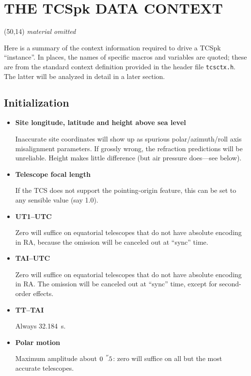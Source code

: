 \documentclass[12pt,fleqn,twoside]{article}
\renewcommand{\_}{{\tt\char'137}}     %
\newcommand{\arcsec}[2] {\arcseci{#1}$\hspace{-0.4em}.#2$}
\newcommand{\arcseci}[1] {$#1\hspace{0.05em}$\raisebox{-0.5ex}
                         {$^{'\hspace{-0.1em}'}$}}
\newcommand{\abridged}  {\vspace{3ex} \begin{center}
                        \framebox(50,14){\vspace*{1mm}
                        \large \it material omitted}
                        \end{center}\vspace{3ex}}
\begin{document}
\newpage
\section{THE TCSpk DATA CONTEXT}

\ifx\vdoc\vshort
\abridged
\else
Here is a summary of the context information required to drive
a TCSpk ``instance''.  In places, the names of specific macros and
variables are quoted;  these are from the standard context definition
provided in the header file {\tt tcsctx.h}.  The latter will be
analyzed in detail in a later section.

\subsection{Initialization}

\begin{itemize}

\item {\bf Site longitude, latitude and height above sea level}

      Inaccurate site coordinates will show up as spurious
      polar/azimuth/roll axis misalignment parameters.  If
      grossly wrong, the refraction predictions will be
      unreliable.  Height makes little difference (but air
      pressure does---see below).

\item {\bf Telescope focal length}

      If the TCS does not support the pointing-origin feature,
      this can be set to any sensible value (say 1.0).

\item {\bf UT1--UTC}

      Zero will suffice on equatorial telescopes that do not
      have absolute encoding in RA, because the omission will be
      canceled out at ``sync'' time.

\item {\bf TAI--UTC}

      Zero will suffice on equatorial telescopes that do not
      have absolute encoding in RA.  The omission will be
      canceled out at ``sync'' time, except for second-order
      effects.

\item {\bf TT--TAI}

      Always 32.184~s.

\item {\bf Polar motion}

      Maximum amplitude about \arcsec{0}{5}: zero will
      suffice on all but the most accurate telescopes.


\end{itemize}
\end{document}
